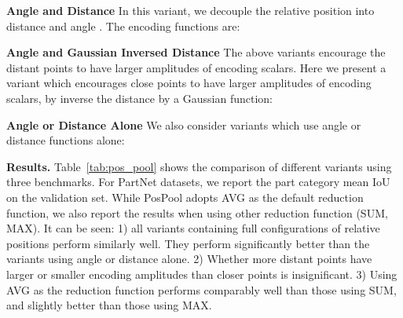 \documentclass[runningheads]{llncs}
\begin{document}
\vspace{0.3em} \noindent \textbf{Angle and Distance} In this variant, we decouple the relative position into distance  and angle . The encoding functions are:
\begin{small}
	
\end{small}

\vspace{0.3em} \noindent \textbf{Angle and Gaussian Inversed Distance} The above variants encourage the distant points to have larger amplitudes of encoding scalars. Here we present a variant which encourages close points to have larger amplitudes of encoding scalars, by inverse the distance by a Gaussian function:
\begin{small}
	
\end{small}

\vspace{0.3em} \noindent \textbf{Angle or Distance Alone} We also consider variants which use angle or distance functions alone:
\begin{small}
	
\end{small}

\vspace{0.3em} \noindent \textbf{Results.} Table~\ref{tab:pos_pool} shows the comparison of different variants using three benchmarks. For PartNet datasets, we report the part category mean IoU on the validation set. While PosPool adopts AVG as the default reduction function, we also report the results when using other reduction function (SUM, MAX). It can be seen: 1) all variants containing full configurations of relative positions perform similarly well. They perform significantly better than the variants using angle or distance alone. 2) Whether more distant points have larger or smaller encoding amplitudes than closer points is insignificant. 3) Using AVG as the reduction function performs comparably well than those using SUM, and slightly better than those using MAX.
\end{document}
